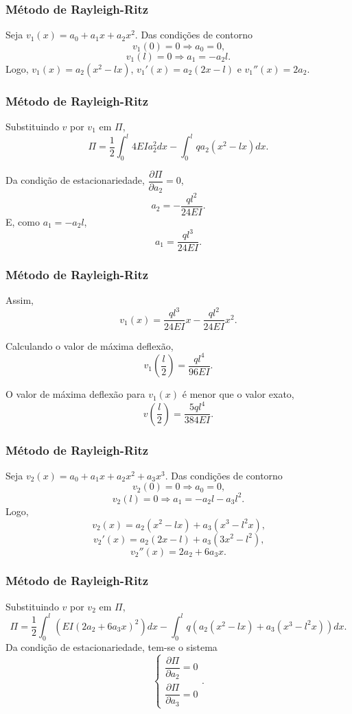 \documentclass{beamer}
\begin{document}
	\begin{frame}
		\frametitle{Método de Rayleigh-Ritz}
		\justify
		
		Seja $v_1(x)=a_0 + a_1 x + a_2 x^2$. \pause Das condições de contorno
		$$
			v_1(0)=0\Longrightarrow a_0 = 0\text{,}
		$$
		\pause
		$$
			v_1(l)=0\Longrightarrow a_1 = -a_2l\text{.}
		$$
		\pause
		Logo, $v_1(x)=a_2(x^2-lx)$, \pause $v_1'(x)=a_2(2x-l)$ \pause e $v_1''(x)=2a_2$.
	\end{frame}
	
	\begin{frame}
		\frametitle{Método de Rayleigh-Ritz}
		\justify
		
		Substituindo $v$ por $v_1$ em $\Pi$,
		$$
			\Pi =
			\frac{1}{2}
			\int_0^l 4 EI a_2 ^2 dx
			-
			\int_0^l q a_2 (x^2-lx) dx
			\text{.}
		$$
		\pause
		
		Da condição de estacionariedade, $\dfrac{\partial \Pi}{\partial a_2}=0$,
		$$
			a_2 = -\frac{ql^2}{24EI}
			\text{.}
		$$
		\pause
		E, como $a_1=-a_2l$,
		$$
			a_1 = \frac{ql^3}{24EI}
			\text{.}
		$$
	\end{frame}
	
	\begin{frame}
		\frametitle{Método de Rayleigh-Ritz}
		\justify
		
		Assim, 
		$$
			v_1(x)=\dfrac{ql^3}{24EI}x - \dfrac{ql^2}{24EI}x^2
			\text{.}
		$$
		\pause
		
		Calculando o valor de máxima deflexão,
		$$
			v_1\left ( \frac{l}{2} \right )
			= \frac{ql^4}{96EI}
			\text{.}
		$$
		\pause
		
		O valor de máxima deflexão para $v_1(x)$ é menor que o valor exato,
		$$
			v\left ( \frac{l}{2} \right )
			= \frac{5ql^4}{384EI}
			\text{.}
		$$
	\end{frame}
	
	\begin{frame}
		\frametitle{Método de Rayleigh-Ritz}
		\justify
		
		Seja $v_2(x)=a_0 + a_1 x + a_2 x^2 + a_3 x^3$. \pause Das condições de contorno
		$$
			v_2(0)=0\Longrightarrow a_0 = 0\text{,}
		$$
		\pause
		$$
			v_2(l)=0\Longrightarrow a_1 = -a_2l - a_3l^2\text{.}
		$$
		\pause
		Logo, 
		$$v_2(x)=a_2(x^2-lx)+a_3(x^3-l^2x)\text{,}$$
		\pause 
		$$v_2'(x)=a_2(2x-l)+a_3(3x^2-l^2)\text{,}$$
		\pause
		$$v_2''(x)=2a_2 + 6a_3x\text{.}$$
	\end{frame}
	
	\begin{frame}
		\frametitle{Método de Rayleigh-Ritz}
		\justify
		
		Substituindo $v$ por $v_2$ em $\Pi$,
		$$
			\Pi=
			\frac{1}{2}
			\int_0^l
				\left (
					EI(2a_2+6a_3x)^2
				\right ) dx
			-
			\int_0^l
				q
				\left (
					a_2(x^2-lx)
					+
					a_3(x^3-l^2x)
				\right ) dx
			\text{.}
		$$
		\pause
		Da condição de estacionariedade, tem-se o sistema
		$$
			\begin{cases}
				\dfrac{\partial \Pi}{\partial a_2}=0\\[10pt]
				\dfrac{\partial \Pi}{\partial a_3}=0
			\end{cases}
			\text{.}
		$$
	\end{frame}
	
\end{document}
